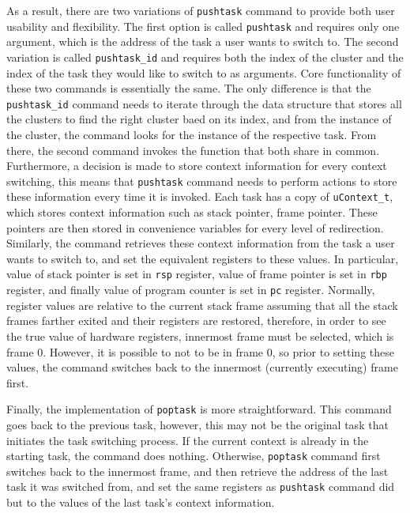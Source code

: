 As a result, there are two variations of \verb|pushtask| command to provide both
user usability and flexibility. The first option is called \verb|pushtask| and requires
only one argument, which is the address of the task a user wants to switch to.
The second variation is called \verb|pushtask_id| and requires both the index of
the cluster and the index of the task they would like
to switch to as arguments. Core functionality of these two commands is
essentially the same. The only difference is that the \verb|pushtask_id| command
needs to iterate through the data structure that stores all the clusters to find
the right cluster baed on its index, and from the instance of the cluster, the
command looks for the instance of the respective task. From there, the second
command invokes the function that both share in common. Furthermore, a decision
is made to store context information for every context switching, this means
that \verb|pushtask| command needs to perform actions to store these information every time it is
invoked. Each task has a copy of \verb|uContext_t|, which stores context
information such as stack pointer, frame pointer. These pointers are then stored
in convenience variables for every level of redirection. Similarly, the command
retrieves these context information from the task a user wants to switch to, and
set the equivalent registers to these values. In particular, value of stack
pointer is set in \verb|rsp| register, value of frame pointer is set in \verb|rbp|
register, and finally value of program counter is set in \verb|pc| register.
Normally, register values are relative to the current stack frame assuming that
all the stack frames farther exited and their registers are restored, therefore, in
order to see the true value of hardware registers, innermost frame must be
selected, which is frame 0\cite{reference11}. However, it is possible to not to be in frame 0, so prior to setting these values,
the command switches back to the innermost (currently executing) frame first.

Finally, the implementation of \verb|poptask| is more straightforward. This
command goes back to the previous task, however, this may not be the original
task that initiates the task switching process. If the current context is
already in the starting task, the command does nothing. Otherwise, \verb|poptask| command first switches back to the innermost frame, and then retrieve the
address of the last task it was switched from, and set the same registers as
\verb|pushtask| command did but to the values of the last task's context
information.
